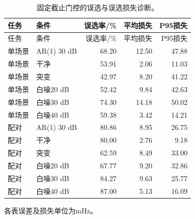 \small
\begin{longtable}{llrrr}
\caption{固定截止门控的误选与误选损失诊断。}\\
\toprule
任务 & 条件 & 误选率/\% & 平均损失 & P95损失 \\
\midrule
\endfirsthead
\toprule
任务 & 条件 & 误选率/\% & 平均损失 & P95损失 \\
\midrule
\endhead
单场景 & AR(1) 30 dB & 68.20 & 12.50 & 47.88 \\
单场景 & 干净 & 53.91 & 2.06 & 11.03 \\
单场景 & 突变 & 42.97 & 8.20 & 41.22 \\
单场景 & 白噪20 dB & 52.42 & 9.84 & 42.63 \\
单场景 & 白噪30 dB & 74.30 & 14.18 & 50.02 \\
单场景 & 白噪40 dB & 59.38 & 3.42 & 14.21 \\
配对 & AR(1) 30 dB & 80.86 & 8.95 & 26.75 \\
配对 & 干净 & 80.00 & 2.76 & 9.18 \\
配对 & 突变 & 62.59 & 8.49 & 33.00 \\
配对 & 白噪20 dB & 67.77 & 9.20 & 32.86 \\
配对 & 白噪30 dB & 84.27 & 9.63 & 25.77 \\
配对 & 白噪40 dB & 87.00 & 5.13 & 16.09 \\
\bottomrule
\end{longtable}
\normalsize 各表误差及损失单位为mHz。
